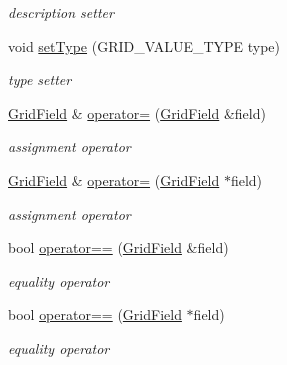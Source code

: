 \begin{DoxyCompactItemize}
\begin{DoxyCompactList}\small\item\em description setter \end{DoxyCompactList}\item 
void \hyperlink{classfwi_1_1grid_1_1GridField_ae1bf4d331ed2be13c2c76b90c6bd100d}{set\-Type} (G\-R\-I\-D\-\_\-\-V\-A\-L\-U\-E\-\_\-\-T\-Y\-P\-E type)
\begin{DoxyCompactList}\small\item\em type setter \end{DoxyCompactList}\item 
\hyperlink{classfwi_1_1grid_1_1GridField}{Grid\-Field} \& \hyperlink{classfwi_1_1grid_1_1GridField_a913603707ba79f27cd579168abafca06}{operator=} (\hyperlink{classfwi_1_1grid_1_1GridField}{Grid\-Field} \&field)
\begin{DoxyCompactList}\small\item\em assignment operator \end{DoxyCompactList}\item 
\hyperlink{classfwi_1_1grid_1_1GridField}{Grid\-Field} \& \hyperlink{classfwi_1_1grid_1_1GridField_aaf6b1c8f6704d9e4b2f673465933c4b9}{operator=} (\hyperlink{classfwi_1_1grid_1_1GridField}{Grid\-Field} $\ast$field)
\begin{DoxyCompactList}\small\item\em assignment operator \end{DoxyCompactList}\item 
bool \hyperlink{classfwi_1_1grid_1_1GridField_a75ad5a8e65ea3c453a0a310f64122c6f}{operator==} (\hyperlink{classfwi_1_1grid_1_1GridField}{Grid\-Field} \&field)
\begin{DoxyCompactList}\small\item\em equality operator \end{DoxyCompactList}\item 
bool \hyperlink{classfwi_1_1grid_1_1GridField_a85e464cba743e345d951fe9fa95f97f3}{operator==} (\hyperlink{classfwi_1_1grid_1_1GridField}{Grid\-Field} $\ast$field)
\begin{DoxyCompactList}\small\item\em equality operator \end{DoxyCompactList}\end{DoxyCompactItemize}
